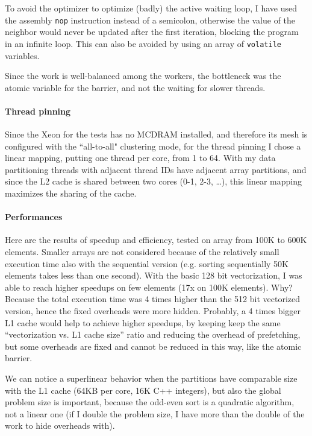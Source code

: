 To avoid the optimizer to optimize (badly) the active waiting loop, I have used the assembly \texttt{nop} instruction instead of a semicolon, otherwise the value of the neighbor would never be updated after the first iteration, blocking the program in an infinite loop. This can also be avoided by using an array of \texttt{volatile} variables.

Since the work is well-balanced among the workers, the bottleneck was the atomic variable for the barrier, and not the waiting for slower threads.

\paragraph{Thread pinning}
Since the Xeon for the tests has no MCDRAM installed, and therefore its mesh is configured with the ``all-to-all" clustering mode, for the thread pinning I chose a linear mapping, putting one thread per core, from 1 to 64. With my data partitioning threads with adjacent thread IDs have adjacent array partitions, and since the L2 cache is shared between two cores (0-1, 2-3, \dots), this linear mapping maximizes the sharing of the cache.

\paragraph{Performances}
Here are the results of speedup and efficiency, tested on array from 100K to 600K elements. Smaller arrays are not considered because of the relatively small execution time also with the sequential version (e.g. sorting sequentially 50K elements takes less than one second). With the basic 128 bit vectorization, I was able to reach higher speedups on few elements (17x on 100K elements). Why? Because the total execution time was 4 times higher than the 512 bit vectorized version, hence the fixed overheads were more hidden. Probably, a 4 times bigger L1 cache would help to achieve higher speedups, by keeping keep the same ``vectorization vs. L1 cache size'' ratio and reducing the overhead of prefetching, but some overheads are fixed and cannot be reduced in this way, like the atomic barrier.

We can notice a superlinear behavior when the partitions have comparable size with the L1 cache (64KB per core, 16K C++ integers), but also the global problem size is important, because the odd-even sort is a quadratic algorithm, not a linear one (if I double the problem size, I have more than the double of the work to hide overheads with).
\bigbreak


